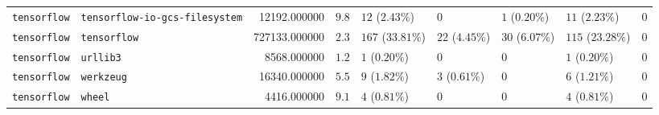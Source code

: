 \begin{table}
\begin{tabular}{llrllllll}
\texttt{tensorflow} & \texttt{tensorflow-io-gcs-filesystem} & 12192.000000 & $9.8$ & $12$ ($2.43\%$) & $0$ & $1$ ($0.20\%$) & $11$ ($2.23\%$) & $0$ \\
\texttt{tensorflow} & \texttt{tensorflow} & 727133.000000 & $2.3$ & $167$ ($33.81\%$) & $22$ ($4.45\%$) & $30$ ($6.07\%$) & $115$ ($23.28\%$) & $0$ \\
\texttt{tensorflow} & \texttt{urllib3} & 8568.000000 & $1.2$ & $1$ ($0.20\%$) & $0$ & $0$ & $1$ ($0.20\%$) & $0$ \\
\texttt{tensorflow} & \texttt{werkzeug} & 16340.000000 & $5.5$ & $9$ ($1.82\%$) & $3$ ($0.61\%$) & $0$ & $6$ ($1.21\%$) & $0$ \\
\texttt{tensorflow} & \texttt{wheel} & 4416.000000 & $9.1$ & $4$ ($0.81\%$) & $0$ & $0$ & $4$ ($0.81\%$) & $0$ \\
\bottomrule
\end{tabular}
\end{table}
